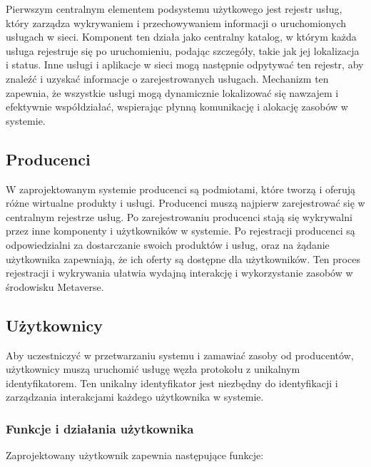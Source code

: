 Pierwszym centralnym elementem podsystemu użytkowego jest rejestr usług, który zarządza wykrywaniem i przechowywaniem informacji o uruchomionych usługach w sieci. Komponent ten działa jako centralny katalog, w którym każda usługa rejestruje się po uruchomieniu, podając szczegóły, takie jak jej lokalizacja i status. Inne usługi i aplikacje w sieci mogą następnie odpytywać ten rejestr, aby znaleźć i uzyskać informacje o zarejestrowanych usługach. Mechanizm ten zapewnia, że wszystkie usługi mogą dynamicznie lokalizować się nawzajem i efektywnie współdziałać, wspierając płynną komunikację i alokację zasobów w systemie.

\subsection{Producenci}

W zaprojektowanym systemie producenci są podmiotami, które tworzą i oferują różne wirtualne produkty i usługi. Producenci muszą najpierw zarejestrować się w centralnym rejestrze usług. Po zarejestrowaniu producenci stają się wykrywalni przez inne komponenty i użytkowników w systemie. Po rejestracji producenci są odpowiedzialni za dostarczanie swoich produktów i usług, oraz na żądanie użytkownika zapewniają, że ich oferty są dostępne dla użytkowników. Ten proces rejestracji i wykrywania ułatwia wydajną interakcję i wykorzystanie zasobów w środowisku Metaverse.

\subsection{Użytkownicy}

Aby uczestniczyć w przetwarzaniu systemu i zamawiać zasoby od producentów, użytkownicy muszą uruchomić usługę węzła protokołu z unikalnym identyfikatorem. Ten unikalny identyfikator jest niezbędny do identyfikacji i zarządzania interakcjami każdego użytkownika w systemie.

\subsubsection{Funkcje i działania użytkownika}

Zaprojektowany użytkownik zapewnia następujące funkcje:

